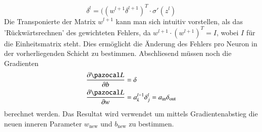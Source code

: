 \begin{equation}
\delta^{l} = ((w^{l+1} \delta^{l+1})^T \cdot \sigma'(z^l)
\end{equation}
Die Transponierte der Matrix $w^{l+1}$ kann man sich intuitiv vorstellen, als das 'Rückwärtsrechnen' des gewichteten Fehlers, da $w^{l+1} \cdot (w^{l+1})^T = I$, wobei $I$ für die Einheitsmatrix steht. Dies ermöglicht die Änderung des Fehlers pro Neuron in der vorherliegenden Schicht zu bestimmen. Abschliesend müssen noch die Gradienten
\begin{equation}
\begin{split}
\frac{\partial \Lb}{\partial b} & = \delta \\
\frac{\partial \Lb}{\partial w} & = a^{l-1}_{k} \delta^{l}_j = a_{\text{in}} \delta_{\text{out}}
\end{split}
\end{equation}
berechnet werden. Das Resultat wird verwendet um mittels Gradientenabstieg die neuen inneren Parameter $w_\text{new}$ und $b_\text{new}$ zu bestimmen.